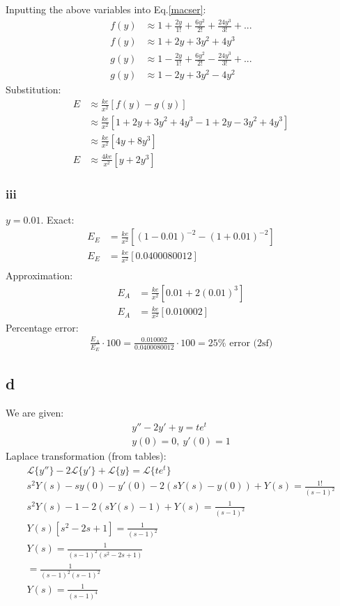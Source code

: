 \documentclass[11pt]{article}
\numberwithin{equation}{section}
\begin{document}
Inputting the above variables into Eq.\ref{macser}:
\begin{align}
	f(y) &\approx 1 + \frac{2 y}{1!} + \frac{6y^2}{2!} + \frac{24y^3}{3!} + ...\\
	f(y) &\approx 1 + 2y + 3y^2 + 4y^3 \\ 
	g(y) &\approx 1 - \frac{2 y}{1!} + \frac{6y^2}{2!} - \frac{24y^3}{3!} + ...\\
	g(y) &\approx 1 - 2y + 3y^2 - 4y^2
\end{align}
Substitution:
\begin{align}
	E &\approx \frac{ke}{x^2} \left[ f(y) - g(y)\right]\\
	&\approx \frac{ke}{x^2} \left[ 1 + 2y + 3y^2 + 4y^3 - 1 + 2y - 3y^2 + 4y^3 \right]\\
	&\approx \frac{ke}{x^2}\left[ 4y + 8y^3 \right]\\
	E &\approx \frac{4ke}{x^2}\left[ y + 2y^3 \right]
\end{align}
\subsubsection*{iii}
$y = 0.01$. Exact:
\begin{align}
	E_E &= \frac{ke}{x^2} \left[\left(1-0.01\right)^{-2}-\left(1+0.01\right)^{-2}\right]\\
	E_E &= \frac{ke}{x^2} \left[0.0400080012\right]\\
\end{align}
Approximation:
\begin{align}
	E_A &= \frac{ke}{x^2} \left[0.01 + 2\left(0.01\right)^3\right]\\
	E_A &= \frac{ke}{x^2} \left[0.010002\right]
\end{align}
Percentage error:
\begin{align}
	\frac{E_A}{E_E} \cdot 100 = \frac{0.010002}{0.0400080012} \cdot 100 = 25\% \textrm{ error (2sf)}
\end{align}
\subsection*{d}
We are given:
\begin{align}
	y'' - 2y' + y = te^t\\
	y(0) = 0, \ y'(0)=1
\end{align}
Laplace transformation (from tables):
\begin{gather}
	\mathcal{L} \{ y''\} - 2\mathcal{L} \{ y'\} + \mathcal{L} \{ y\} = \mathcal{L} \{te^t \}\\
	s^2 Y(s) - sy(0) - y'(0) - 2\left(sY(s) - y(0)\right) + Y(s) = \frac{1!}{\left(s-1\right)^2}\\
	s^2 Y(s) -1 -2(sY(s) - 1) + Y(s) = \frac{1}{\left(s-1\right)^2}\\
	Y(s)\left[s^2-2s+1\right] = \frac{1}{\left(s-1\right)^2}\\
	Y(s) = \frac{1}{\left(s-1\right)^2\left(s^2-2s+1\right)}\\
	= \frac{1}{\left(s-1\right)^2\left(s-1\right)^2}\\
	Y(s) = \frac{1}{\left(s-1\right)^4} 
\end{gather}
\end{document}
